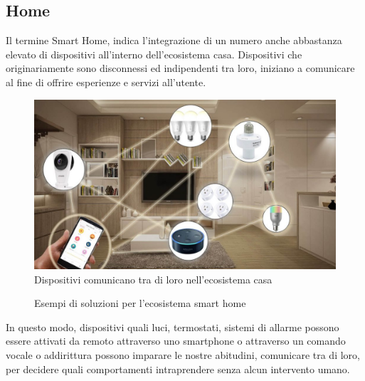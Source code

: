 \subsection{Home}
Il termine Smart Home, indica l'integrazione di un numero anche abbastanza elevato di dispositivi all'interno dell'ecosistema casa. Dispositivi che originariamente sono disconnessi ed indipendenti tra loro, iniziano a comunicare al fine di offrire esperienze e servizi all'utente.\\
\begin{figure}
	\begin{center}
		\includegraphics[width=0.6\columnwidth]{images/application_smart_home_1.jpg}
	\end{center}
	\caption{Dispositivi comunicano tra di loro nell'ecosistema casa}
	\label{fig:application_smart_home_1}
\end{figure}
\begin{figure}%
	\centering
	\qquad
	\caption{Esempi di soluzioni per l'ecosistema smart home}%
	\label{fig:application_smart_home_23}%
\end{figure}
In questo modo, dispositivi quali luci, termostati, sistemi di allarme possono essere attivati da remoto attraverso uno smartphone o attraverso un comando vocale o addirittura possono imparare le nostre abitudini, comunicare tra di loro, per decidere quali comportamenti intraprendere senza alcun intervento umano.


